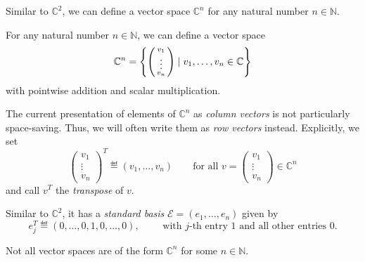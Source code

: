 \documentclass[a4paper,oneside, 12pt]{amsart}
\begin{document}
Similar to \( \mathbb{C}^{2}\), we can define a vector space \( \mathbb{C}^{n}\) for any natural number \(n \in \mathbb{N}\).

\begin{example}\label{ex:cn}
  For any  natural number \(n\in \mathbb{N}\), we can define a vector space
  \begin{equation*}
    \mathbb{C}^n= \left\{\begin{psmallmatrix}  v_{1}\\ \vdots \\ v_{n} \end{psmallmatrix} \mid v_{1}, \dots , v_{n} \in \mathbb{C} \right\}
  \end{equation*}
  with pointwise addition and scalar multiplication.

  The current presentation of elements of \( \mathbb{C}^{n}\) as \emph{column vectors} is not particularly space-saving.
  Thus, we will often write them as \emph{row vectors} instead.
  Explicitly, we set
  \begin{equation*}
    \begin{pmatrix}
      v_{1}\\ \vdots \\ v_{n} \end{pmatrix}^{T}
    \eqdef
    ( v_{1}, \dots, v_{n} )\qquad
    \text{for all } v=     \begin{pmatrix}
      v_{1}\\ \vdots \\ v_{n} \end{pmatrix} \in \mathbb{C}^{n}
  \end{equation*}
  and call \(v^{T}\) the \emph{transpose} of \(v\).


  Similar to \( \mathbb{C}^{2}\), it has a \emph{standard basis} \( \mathcal{E} = (e_{1}, \dots , e_{n})\) given by
  \begin{equation*}
    e_{j}^{T} \eqdef
    ( 0 , \dots , 0 , 1 , 0 , \dots , 0), \qquad \text{ with \(j\)-th entry \(1\) and all other entries \(0\).}
  \end{equation*}
\end{example}

Not all vector spaces are of the form \( \mathbb{C}^{n}\) for some \(n\in \mathbb{N}\).
\end{document}
